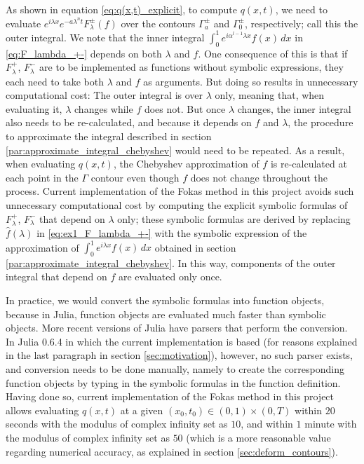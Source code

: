 \documentclass[12pt, oneside, a4paper]{article}
\begin{document}
As shown in equation \eqref{eq:q(x,t)_explicit}, to compute $q(x,t)$, we need to evaluate $e^{i\lambda x}e^{-a\lambda^n t}F_\lambda^\pm(f)$ over the contours $\Gamma_a^\pm$ and $\Gamma_0^\pm$, respectively; call this the outer integral. We note that the inner integral $\int_0^1 e^{i\alpha^{l-1}\lambda x}f(x)\,dx$ in \eqref{eq:F_lambda_+-} depends on both $\lambda$ and $f$. One consequence of this is that if $F_\lambda^+$, $F_\lambda^-$ are to be implemented as functions without symbolic expressions, they each need to take both $\lambda$ and $f$ as arguments. But doing so results in unnecessary computational cost: The outer integral is over $\lambda$ only, meaning that, when evaluating it, $\lambda$ changes while $f$ does not. But once $\lambda$ changes, the inner integral also needs to be re-calculated, and because it depends on $f$ and $\lambda$, the procedure to approximate the integral described in section \ref{par:approximate_integral_chebyshev} would need to be repeated. As a result, when evaluating $q(x,t)$, the Chebyshev approximation of $f$ is re-calculated at each point in the $\Gamma$ contour even though $f$ does not change throughout the process. Current implementation of the Fokas method in this project avoids such unnecessary computational cost by computing the explicit symbolic formulas of $F_\lambda^+$, $F_\lambda^-$ that depend on $\lambda$ only; these symbolic formulas are derived by replacing $\hat{f}(\lambda)$ in \eqref{eq:ex1_F_lambda_+-} with the symbolic expression of the approximation of $\int_0^1 e^{i\lambda x}f(x)\,dx$ obtained in section \ref{par:approximate_integral_chebyshev}.
In this way, components of the outer integral that depend on $f$ are evaluated only once.

In practice, we would convert the symbolic formulas into function objects, because in Julia, function objects are evaluated much faster than symbolic objects. More recent versions of Julia have parsers that perform the conversion. In Julia 0.6.4 in which the current implementation is based (for reasons explained in the last paragraph in section \ref{sec:motivation}), however, no such parser exists, and conversion needs to be done manually, namely to create the corresponding function objects by typing in the symbolic formulas in the function definition. Having done so, current implementation of the Fokas method in this project allows evaluating $q(x,t)$ at a given $(x_0, t_0)\in (0,1)\times (0,T)$ within $20$ seconds with the modulus of complex infinity set as $10$, and within $1$ minute with the modulus of complex infinity set as $50$ (which is a more reasonable value regarding numerical accuracy, as explained in section \ref{sec:deform_contours}).
\end{document}
